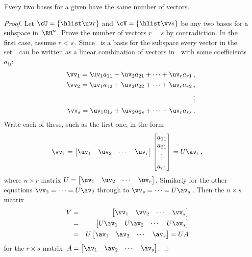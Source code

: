 \begin{theorem} \label{thm:sameDii} 
Every two bases for a given  have the same number of vectors.
\end{theorem}
\begin{proof} 
Let \(\cU=\{\hlist\uv r\}\) and \(\cV=\{\hlist\vv s\}\) be any two  bases for a subspace in~\(\RR^n\).
Prove the number of vectors \(r=s\) by contradiction.
In the first case, assume \(r<s\)\,.
Since \cU\ is a basis for the subspace every vector in the set~\cV\ can be written as a linear combination of vectors in~\cU\ with some coefficients~\(a_{ij}\):
\begin{eqnarray*}
  &&\vv_1=\uv_1a_{11}+\uv_2a_{21}+\cdots+\uv_ra_{r1}\,,
\\&&\vv_2=\uv_1a_{12}+\uv_2a_{22}+\cdots+\uv_ra_{r2}\,,
\\&&\quad\vdots
\\&&\vv_s=\uv_1a_{1s}+\uv_2a_{2s}+\cdots+\uv_ra_{rs}\,.
\end{eqnarray*}
Write each of these, such as the first one, in the form
\begin{equation*}
\vv_1=\begin{bmatrix} \uv_1&\uv_2&\cdots&\uv_r \end{bmatrix}
\begin{bmatrix} a_{11}\\a_{21}\\\vdots\\a_{r1} \end{bmatrix}
=U\av_1\,,
\end{equation*}
where \(n\times r\) matrix \(U=\begin{bmatrix} \uv_1&\uv_2&\cdots&\uv_r \end{bmatrix}\).
Similarly for the other equations \(\vv_2=\cdots=U\av_2\) through to \(\vv_s=\cdots=U\av_s\)\,.
Then the \(n\times s\) matrix
\begin{eqnarray*}
V&=&\begin{bmatrix} \vv_1&\vv_2&\cdots&\vv_s \end{bmatrix}
\\&=&\begin{bmatrix} U\av_1& U\av_2&\cdots&U\av_s\end{bmatrix}
\\&=&U\begin{bmatrix} \av_1& \av_2&\cdots&\av_s\end{bmatrix}
=UA
\end{eqnarray*}
for the \(r\times s\) matrix~\(A=\begin{bmatrix} \av_1& \av_2&\cdots&\av_s \end{bmatrix}\).

\end{proof}
